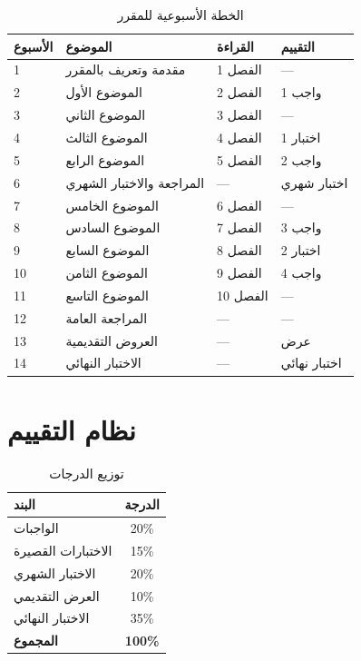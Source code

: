 \documentclass[11pt,a4paper]{article}
\begin{document}
\begin{table}[H]
\centering
\small
\caption{الخطة الأسبوعية للمقرر}
\renewcommand{\arraystretch}{1.3}
\begin{tabularx}{\textwidth}{C{1.5cm} X C{2.5cm} C{2.5cm}}
\toprule
\textbf{الأسبوع} & \textbf{الموضوع} & \textbf{القراءة} & \textbf{التقييم} \\
 & مقدمة وتعريف بالمقرر & الفصل 1 & --- \\
2 & الموضوع الأول & الفصل 2 & واجب 1 \\
3 & الموضوع الثاني & الفصل 3 & --- \\
4 & الموضوع الثالث & الفصل 4 & اختبار 1 \\
5 & الموضوع الرابع & الفصل 5 & واجب 2 \\
6 & المراجعة والاختبار الشهري & --- & اختبار شهري \\
7 & الموضوع الخامس & الفصل 6 & --- \\
8 & الموضوع السادس & الفصل 7 & واجب 3 \\
9 & الموضوع السابع & الفصل 8 & اختبار 2 \\
10 & الموضوع الثامن & الفصل 9 & واجب 4 \\
11 & الموضوع التاسع & الفصل 10 & --- \\
12 & المراجعة العامة & --- & --- \\
13 & العروض التقديمية & --- & عرض \\
14 & الاختبار النهائي & --- & اختبار نهائي \\
\bottomrule
\end{tabularx}
\end{table}

\section{نظام التقييم}
\label{sec:grading}

\begin{table}[H]
\centering
\caption{توزيع الدرجات}
\begin{tabular}{|l|c|}
\hline
\textbf{البند} & \textbf{الدرجة} \\
\hline
الواجبات & 20\% \\
الاختبارات القصيرة & 15\% \\
الاختبار الشهري & 20\% \\
العرض التقديمي & 10\% \\
الاختبار النهائي & 35\% \\
\hline
\textbf{المجموع} & \textbf{100\%} \\
\hline
\end{tabular}
\end{table}
\end{document}
